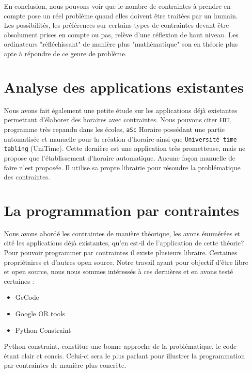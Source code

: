 En conclusion, nous pouvons voir que le nombre de contraintes à prendre en compte pose un réel problème quand elles doivent être traitées par un humain. Les possibilités, les préférences sur certains types de contraintes devant être absolument prises en compte ou pas, relève d'une réflexion de haut niveau. Les ordinateurs "réfléchissant" de manière plus "mathématique" son en théorie plus apte à répondre de ce genre de problème.

\section{Analyse des applications existantes}
Nous avons fait également une petite étude sur les applications déjà existantes permettant d'élaborer des horaires avec contraintes. Nous pouvons citer \texttt{EDT}, programme très repandu dans les écoles, \texttt{aSc} Horaire possédant une partie automatisée et manuelle pour la création d'horaire ainsi que \texttt{Université time tabling} (UniTime). Cette dernière est une application très prometteuse, mais ne propose que l'établissement d'horaire automatique. Aucune façon manuelle de faire n'est proposée. Il utilise sa propre librairie pour résoudre la problématique des contraintes.

\section{La programmation par contraintes}
Nous avons abordé les contraintes de manière théorique, les avons énumérées et cité les applications déjà existantes, qu'en est-il de l'application de cette théorie? Pour pouvoir programmer par contraintes il existe plusieurs libraire. Certaines propriétaires et d'autres open source. Notre travail ayant pour objectif d'être libre et open source, nous nous sommes intéressés à ces dernières et en avons testé certaines :\\
\begin{itemize}
\item GeCode
\item Google OR tools
\item Python Constraint
\end{itemize}
\bigskip

Python constraint, constitue une bonne approche de la problématique, le code étant clair et concis. Celui-ci sera le plus parlant pour illustrer la programmation par contraintes de manière plus concrète.

